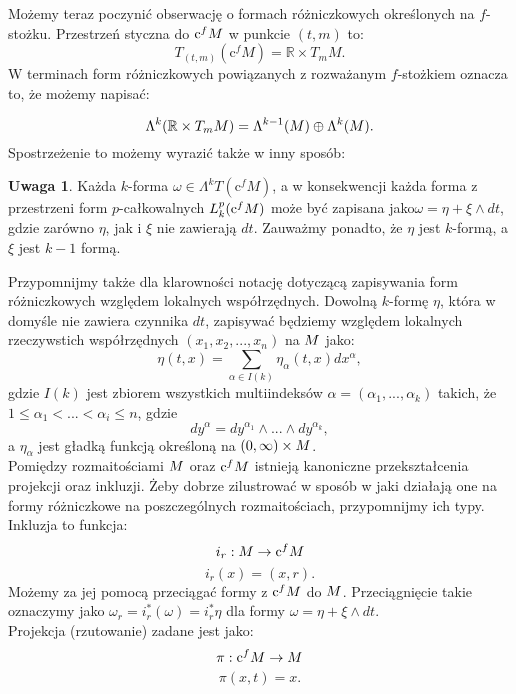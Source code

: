 \documentclass[licencjacka]{pracamgr}
\theoremstyle{definition}
\theoremstyle{definition}
\newtheorem{remark}{Uwaga}[section]
\theoremstyle{plain}
\theoremstyle{plain}
\def\cfm{\ensuremath\mathrm{c}^fM}
\def\M{\ensuremath M}
\begin{document}

Możemy teraz poczynić obserwację o formach różniczkowych określonych na 
$f$-stożku. Przestrzeń styczna do $\cfm$ w punkcie $(t, m)$ to:
\[
    T_{(t, m)} (\mathrm{c}^f M) = \mathbb{R} \times T_m M.
\]
W terminach form różniczkowych powiązanych z rozważanym $f$-stożkiem oznacza to, 
że możemy napisać:

\[
\Lambda^k(\mathbb{R} \times T_m \M) = 
\Lambda^{k-1}(\M)  \oplus \Lambda^k(\M).
\]
Spostrzeżenie to możemy wyrazić także w inny sposób: 

\begin{remark}
Każda $k$-forma $\omega \in \Lambda^k T(\mathrm{c}^f M)$, 
a w konsekwencji każda forma z przestrzeni form $p$-całkowalnych  $L_k^p
(\cfm)$ może być zapisana jako$\omega = \eta + \xi \wedge dt$,
gdzie zarówno $\eta$, jak i  $\xi$ nie zawierają $dt$.  Zauważmy ponadto,
że $\eta$ jest $k$-formą, a $\xi$ jest $k-1$ formą. \\
\end{remark}

Przypomnijmy także dla klarowności notację dotyczącą zapisywania form różniczkowych
względem lokalnych współrzędnych. Dowolną $k$-formę $\eta$, która w domyśle nie zawiera
czynnika $dt$, zapisywać będziemy względem lokalnych rzeczywstich współrzędnych
$(x_1, x_2, ... , x_n)$ na $\M$ jako:
\[
    \eta(t, x) = \sum_{\alpha \in I(k)} \eta_\alpha (t, x) dx^\alpha,
\]
gdzie $I(k)$ jest zbiorem wszystkich multiindeksów $\alpha = (\alpha_1, ...,
\alpha_k)$ takich, że $1 \leq \alpha_1 < ... < \alpha_i \leq n$, gdzie
\begin{equation}\label{notacja}
    dy^\alpha = dy^{\alpha_1} \wedge ... \wedge dy^{\alpha_k},
\end{equation}
a $\eta_\alpha$ jest gładką funkcją określoną na $(0, \infty) \times \M$. \\

Pomiędzy rozmaitościami $\M$ oraz $\cfm$ istnieją kanoniczne przekształcenia
projekcji oraz inkluzji. Żeby dobrze zilustrować w sposób w jaki działają one
na formy różniczkowe na poszczególnych rozmaitościach, przypomnijmy ich typy.
Inkluzja to funkcja:
\[
    i_r: \M \rightarrow \cfm \\
\]
\[
    i_r(x) = (x, r).
\]
Możemy za jej pomocą przeciągać formy z $\cfm$ do $\M$. Przeciągnięcie takie
oznaczymy jako $\omega_r = i_r^\ast(\omega) = i_r^\ast \eta $ dla formy $\omega
= \eta + \xi \wedge dt$. \\
Projekcja (rzutowanie) zadane jest jako:
\[
    \pi: \cfm \rightarrow \M
\]
\[
    \pi (x, t) = x.
\] \\
\end{document}
